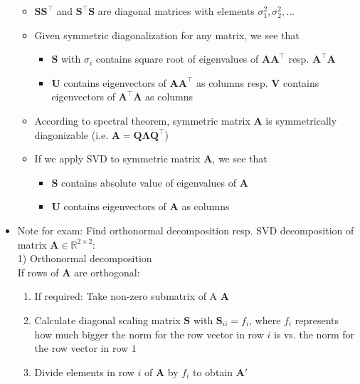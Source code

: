 \begin{itemize}
\begin{itemize}
\begin{itemize}
        \end{itemize}
        \item $\boldsymbol{S}\boldsymbol{S}^\intercal$ and $\boldsymbol{S}^\intercal\boldsymbol{S}$ are diagonal matrices with elements $\sigma_1^2, \sigma_2^2, ...$
        \item Given symmetric diagonalization for any matrix, we see that
        \begin{itemize}
            \item $\boldsymbol{S}$ with $\sigma_i$ contains square root of eigenvalues of $\boldsymbol{A}\boldsymbol{A}^\intercal$ resp. $\boldsymbol{A}^\intercal\boldsymbol{A}$
            \item $\boldsymbol{U}$ contains eigenvectors of  $\boldsymbol{A}\boldsymbol{A}^\intercal$ as columns resp. $\boldsymbol{V}$ contains eigenvectors of $\boldsymbol{A}^\intercal\boldsymbol{A}$ as columns
        \end{itemize}
        \item According to spectral theorem, symmetric matrix $\boldsymbol{A}$ is symmetrically diagonizable (i.e. $\boldsymbol{A} = \boldsymbol{Q} \boldsymbol{\Lambda} \boldsymbol{Q}^\intercal$) 
        \item If we apply SVD to symmetric matrix $\boldsymbol{A}$, we see that
        \begin{itemize}
            \item $\boldsymbol{S}$ contains absolute value of eigenvalues of $\boldsymbol{A}$ 
            \item $\boldsymbol{U}$ contains eigenvectors of $\boldsymbol{A}$ as columns
        \end{itemize}
    \end{itemize}
    \item Note for exam: Find orthonormal decomposition resp. SVD decomposition of matrix $\boldsymbol{A} \in \mathbb{R}^{2 \times 2}$:\\
    1) Orthonormal decomposition\\
    If rows of $\boldsymbol{A}$ are orthogonal:
    \begin{enumerate}
        \item If required: Take non-zero submatrix of A $\boldsymbol{A}$
        \item Calculate diagonal scaling matrix $\boldsymbol{S}$ with $\boldsymbol{S}_{ii} = f_i$, where $f_i$ represents how much bigger the norm for the row vector in row $i$ is vs. the norm for the row vector in row $1$
        \item Divide elements in row $i$ of $\boldsymbol{A}$ by $f_i$ to obtain $\boldsymbol{A}'$

\end{enumerate}
\end{itemize}
